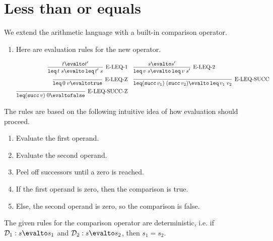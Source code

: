 \documentclass[11pt,letterpaper]{article}
\begin{document}
\section{Less than or equals}
\newcommand{\Succ}{\operatorname{\mathtt{succ}}}
\newcommand{\Leq}[2]{\operatorname{\mathtt{leq}} #1 \; #2}

We extend the arithmetic language with a built-in comparison operator.

\begin{enumerate}
    \item
        Here are evaluation rules for the new operator.

        \begin{align*}
            \infer[\text{E-LEQ-1}]{
                \Leq{t}{s}
                \evalto
                \Leq{t^\prime}{s}
            }{
                t \evalto t^\prime
            }
            &\quad
            \infer[\text{E-LEQ-2}]{
                \Leq{v}{s}
                \evalto
                \Leq{v}{s^\prime}
            }{
                s \evalto s^\prime
            }
            \\
            \infer[\text{E-LEQ-Z}]{
                \Leq{0}{v}
                \evalto
                \mathtt{true}
            }{}
            &\quad
            \infer[\text{E-LEQ-SUCC}]{
                \Leq{(\Succ v_1)}{(\Succ v_2)}
                \evalto
                \Leq{v_1}{v_2}
            }{}
            \\
            \infer[\text{E-LEQ-SUCC-Z}]{
                \Leq{(\Succ v)}{0}
                \evalto
                \mathtt{false}
            }{}
            &\quad
        \end{align*}
\end{enumerate}

The rules are based on the following intuitive idea of how evaluation should
proceed.
\begin{enumerate}
    \item Evaluate the first operand.
    \item Evaluate the second operand.
    \item Peel off successors until a zero is reached.
    \item If the first operand is zero, then the comparison is true.
    \item Else, the second operand is zero, so the comparison is false.
\end{enumerate}

\begin{prop}
    The given rules for the comparison operator are deterministic,
    i.e. if $\mathcal{D}_1 : s \evalto s_1$
    and $\mathcal{D}_2 : s \evalto s_2$,
    then $s_1 = s_2$.
\end{prop}
\end{document}

